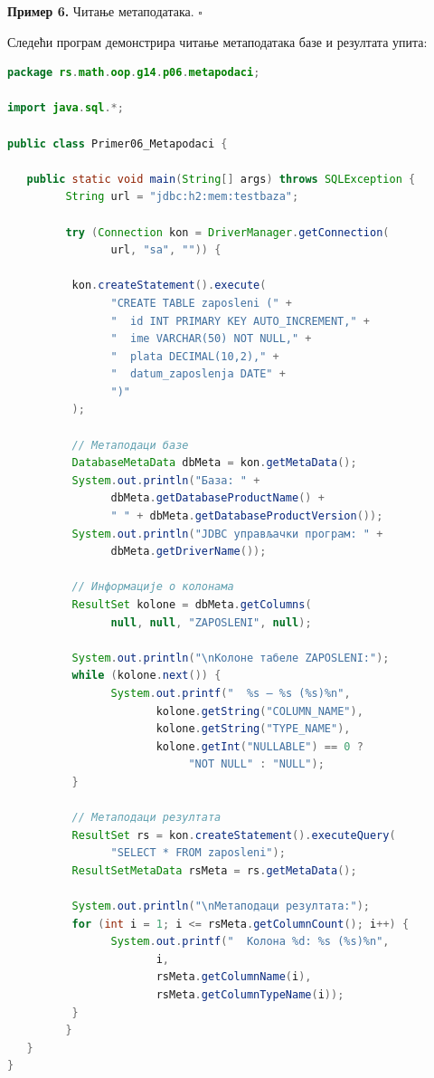 \bigskip

\noindent \textbf{Пример 6.} Читање метаподатака. $\square$

\medskip

Следећи програм демонстрира читање метаподатака базе и резултата упита:


\begin{lstlisting}[language=Java]
package rs.math.oop.g14.p06.metapodaci;
 
import java.sql.*;
 
public class Primer06_Metapodaci {
 
   public static void main(String[] args) throws SQLException {
         String url = "jdbc:h2:mem:testbaza";
 
         try (Connection kon = DriverManager.getConnection(
                url, "sa", "")) {
 
          kon.createStatement().execute(
                "CREATE TABLE zaposleni (" +
                "  id INT PRIMARY KEY AUTO_INCREMENT," +
                "  ime VARCHAR(50) NOT NULL," +
                "  plata DECIMAL(10,2)," +
                "  datum_zaposlenja DATE" +
                ")"
          );
 
          // Метаподаци базе
          DatabaseMetaData dbMeta = kon.getMetaData();
          System.out.println("База: " +
                dbMeta.getDatabaseProductName() +
                " " + dbMeta.getDatabaseProductVersion());
          System.out.println("JDBC управљачки програм: " +
                dbMeta.getDriverName());
 
          // Информације о колонама
          ResultSet kolone = dbMeta.getColumns(
                null, null, "ZAPOSLENI", null);
 
          System.out.println("\nКолоне табеле ZAPOSLENI:");
          while (kolone.next()) {
                System.out.printf("  %s – %s (%s)%n",
                       kolone.getString("COLUMN_NAME"),
                       kolone.getString("TYPE_NAME"),
                       kolone.getInt("NULLABLE") == 0 ?
                            "NOT NULL" : "NULL");
          }
 
          // Метаподаци резултата
          ResultSet rs = kon.createStatement().executeQuery(
                "SELECT * FROM zaposleni");
          ResultSetMetaData rsMeta = rs.getMetaData();
 
          System.out.println("\nМетаподаци резултата:");
          for (int i = 1; i <= rsMeta.getColumnCount(); i++) {
                System.out.printf("  Колона %d: %s (%s)%n",
                       i,
                       rsMeta.getColumnName(i),
                       rsMeta.getColumnTypeName(i));
          }
         }
   }
}
\end{lstlisting}


